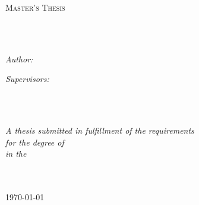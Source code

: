 \documentclass[
11pt, %
english, %
singlespacing, %
headsepline, %
]{MastersDoctoralThesis} %
\author{Oyetunji Daniel \textsc{Abioye}} %
\begin{document}
\frontmatter %

\pagestyle{plain} %


\begin{titlepage}
\begin{center}

\vspace*{.06\textheight}
{\scshape\LARGE \univname\par}\vspace{1.5cm} %
\textsc{\Large Master's Thesis}\\[0.5cm] %

\HRule \\[0.4cm] %
{\huge \bfseries \ttitle\par}\vspace{0.4cm} %
\HRule \\[1.5cm] %
 
\begin{minipage}[t]{0.4\textwidth}
\begin{flushleft} \large
\emph{Author:}\\
\href{https://www.oyetunji.com}{\authorname} %
\end{flushleft}
\end{minipage}
\begin{minipage}[t]{0.4\textwidth}
\begin{flushright} \large
\emph{Supervisors:} \\
\href{https://iscpif.fr}{\supname} \\ %
\href{https://idmc.univ-lorraine.fr}{\examname} %
\end{flushright}
\end{minipage}\\[3cm]

\vfill

\large \textit{A thesis submitted in fulfillment of the requirements\\ for the degree of \degreename}\\[0.3cm] %
\textit{in the}\\[0.4cm]
\groupname\\\deptname\\[2cm] %
 
\vfill

{\large \today}\\[4cm] %
 
\vfill
\end{center}
\end{titlepage}
\end{document}

